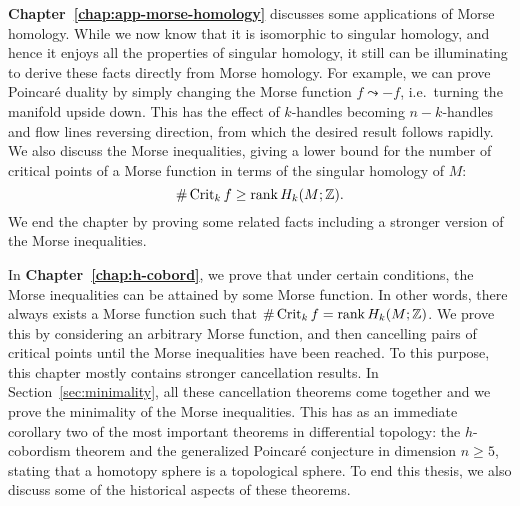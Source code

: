 \bigskip
\textbf{Chapter~\ref{chap:app-morse-homology}} discusses some applications of Morse homology.
While we now know that it is isomorphic to singular homology, and hence it enjoys all the properties of singular homology, it still can be illuminating to derive these facts directly from Morse homology.
For example, we can prove Poincaré duality by simply changing the Morse function $f \leadsto -f$, i.e.\ turning the manifold upside down.  This has the effect of $k$-handles becoming $n-k$-handles and flow lines reversing direction, from which the desired result follows rapidly.
We also discuss the Morse inequalities, giving a lower bound for the number of critical points of a Morse function in terms of the singular homology of $M$:
 \[
     \# \operatorname{Crit}_k f \ge \operatorname{rank} H_k(M; \mathbb{Z})
.\] 
We end the chapter by proving some related facts including a stronger version of the Morse inequalities.

\bigskip
In \textbf{Chapter~\ref{chap:h-cobord}}, we prove that under certain conditions, the Morse inequalities can be attained by some Morse function.
In other words, there always exists a Morse function such that $\# \operatorname{Crit}_k f = \operatorname{rank} H_k(M; \mathbb{Z})$.
We prove this by considering an arbitrary Morse function,
and then cancelling pairs of critical points until the Morse inequalities have been reached.
To this purpose, this chapter mostly contains stronger cancellation results.
In Section~\ref{sec:minimality}, all these cancellation theorems come together and we prove the minimality of the Morse inequalities.
This has as an immediate corollary two of the most important theorems in differential topology: the $h$-cobordism theorem and the generalized Poincaré conjecture in dimension $n \ge 5$, stating that a homotopy sphere is a topological sphere.
To end this thesis, we also discuss some of the historical aspects of these theorems.
